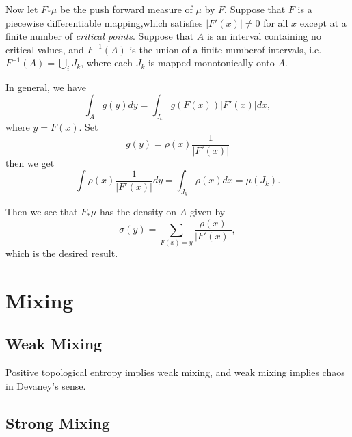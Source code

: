 \documentclass[12pt,twoside]{book}
\begin{document}
Now let $F_*\mu$ be the push forward measure of $\mu$ by $F$.
Suppose that $F$ is a piecewise differentiable mapping,which satisfies $|F'(x)| \neq 0$ for all $x$ except at a finite number of \textit{critical points}. 
Suppose that $A$ is an interval containing no critical values, and $F^{-1}(A)$ is the union of a finite numberof intervals, i.e. $F^{-1}(A) = \bigcup\limits_{i}J_k$, where each $J_k$ is mapped monotonically onto $A$.

In general, we have
\begin{equation*}
  \int_A g(y)dy = \int_{J_k} g(F(x))|F'(x)| dx,
\end{equation*}
where $y = F(x)$. Set
\begin{equation*}
  g(y) = \rho(x)\frac{1}{|F'(x)|}
\end{equation*}
then we get
\begin{equation*}
  \int \rho(x)\frac{1}{|F'(x)|}dy = \int_{J_k} \rho(x)dx = \mu(J_k).
\end{equation*}

Then we see that $F_*\mu$ has the density on $A$ given by
\begin{equation*}
  \sigma(y) = \sum\limits_{F(x) = y} \frac{\rho(x)}{|F'(x)|},
\end{equation*}
which is the desired result.

\section{Mixing}
\subsection{Weak Mixing}
Positive topological entropy implies weak mixing, and weak mixing implies chaos in Devaney's sense.
\subsection{Strong Mixing}




\printindex
\end{document}
